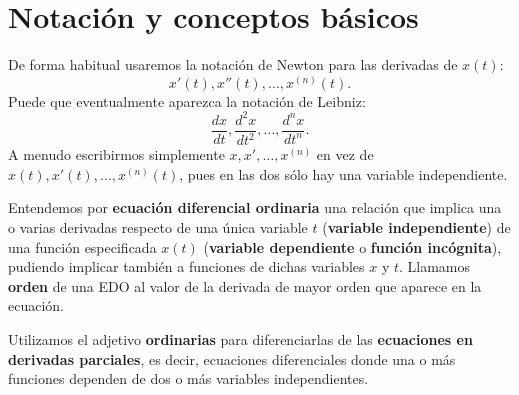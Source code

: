 \section{Notación y conceptos básicos}
\begin{notation}
De forma habitual usaremos la notación de Newton para las derivadas de $\displaystyle x\left(t\right) $:  
\[x'\left(t\right), x''\left(t\right), \ldots, x^{\left(n\right)}\left(t\right) .\]
Puede que eventualmente aparezca la notación de Leibniz:
\[\frac{dx}{dt}, \frac{d^{2}x}{dt ^{2}}, \ldots, \frac{d^{n}x}{dt ^{n}} .\]
A menudo escribirmos simplemente $\displaystyle x, x', \ldots, x^{\left(n\right)} $ en vez de $\displaystyle x\left(t\right), x'\left(t\right), \ldots, x^{\left(n\right)}\left(t\right) $, pues en las dos sólo hay una variable independiente.
\end{notation}
\begin{definition}[EDO]
Entendemos por \textbf{ecuación diferencial ordinaria} una relación que implica una o varias derivadas respecto de una única variable $\displaystyle t $ (\textbf{variable independiente}) de una función especificada $\displaystyle x\left(t\right) $ (\textbf{variable dependiente} o \textbf{función incógnita}), pudiendo implicar también a funciones de dichas variables $\displaystyle x $ y $\displaystyle t $. Llamamos \textbf{orden} de una EDO al valor de la derivada de mayor orden que aparece en la ecuación.
\end{definition}
\begin{observation}
Utilizamos el adjetivo \textbf{ordinarias} para diferenciarlas de las \textbf{ecuaciones en derivadas parciales}, es decir, ecuaciones diferenciales donde una o más funciones dependen de dos o más variables independientes.
\end{observation}


